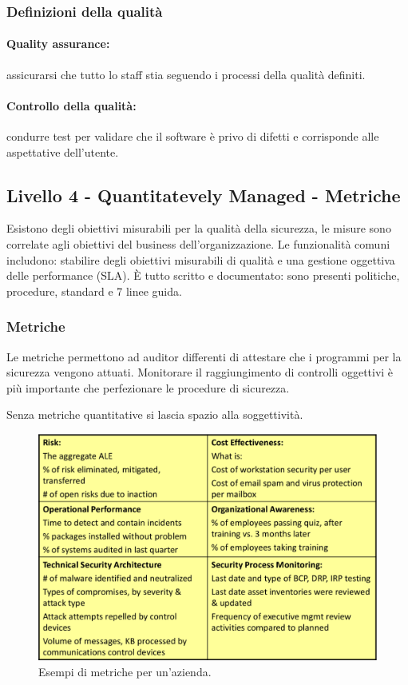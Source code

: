 \subsubsection{Definizioni della qualità}

\paragraph*{Quality assurance:} assicurarsi che tutto lo staff stia seguendo i
processi della qualità definiti.

\paragraph*{Controllo della qualità:} condurre test per validare che il
software è privo di difetti e corrisponde alle aspettative dell'utente.

\subsection{Livello 4 - Quantitatevely Managed - Metriche}

Esistono degli obiettivi misurabili per la qualità della sicurezza, le misure
sono correlate agli obiettivi del business dell'organizzazione. Le
funzionalità comuni includono: stabilire degli obiettivi misurabili di qualità
e una gestione oggettiva delle performance (SLA).
È tutto scritto e documentato: sono presenti politiche, procedure, standard e 7
linee guida.

\subsubsection{Metriche}

Le metriche permettono ad auditor differenti di attestare che i programmi per
la sicurezza vengono attuati. Monitorare il raggiungimento di controlli
oggettivi è più importante che perfezionare le procedure di sicurezza.

Senza metriche quantitative si lascia spazio alla soggettività.

\begin{figure}[h!]
        \begin{center}
                \includegraphics[scale=1.5]{res/img/metriche}
        \end{center}
        \caption{Esempi di metriche per un'azienda.}
\end{figure}

